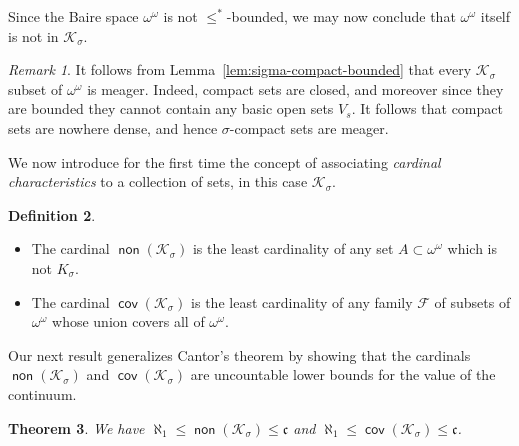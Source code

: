 \documentclass[11pt,oneside]{amsbook}
\newcommand{\Ksigma}{\mathcal K_\sigma}
\DeclareMathOperator{\non}{\mathsf{non}}
\DeclareMathOperator{\cov}{\mathsf{cov}}
\theoremstyle{definition}
\theoremstyle{plain}
\newtheorem{theorem}{Theorem}[section]
\theoremstyle{definition}
\newtheorem{definition}[theorem]{Definition}
\theoremstyle{remark}
\newtheorem{remark}[theorem]{Remark}
\numberwithin{equation}{section}
\numberwithin{figure}{section}
\begin{document}
Since the Baire space $\omega^\omega$ is not $\leq^*$-bounded, we may now conclude that $\omega^\omega$ itself is not in $\mathcal K_\sigma$.

\begin{remark}
  \label{rem:ksigma-meager}
  It follows from Lemma~\ref{lem:sigma-compact-bounded} that every $\Ksigma$ subset of $\omega^\omega$ is meager. Indeed, compact sets are closed, and moreover since they are bounded they cannot contain any basic open sets $V_s$. It follows that compact sets are nowhere dense, and hence $\sigma$-compact sets are meager.
\end{remark}


We now introduce for the first time the concept of associating \emph{cardinal characteristics} to a collection of sets, in this case $\mathcal K_\sigma$.

\begin{definition}
  \begin{itemize}
  \item The cardinal $\non(\Ksigma)$ is the least cardinality of any set $A\subset\omega^\omega$ which is not $K_\sigma$.
  \item The cardinal $\cov(\Ksigma)$ is the least cardinality of any family $\mathcal F$ of subsets of $\omega^\omega$ whose union covers all of $\omega^\omega$.
  \end{itemize}
\end{definition}

Our next result generalizes Cantor's theorem by showing that the cardinals $\non(\Ksigma)$ and $\cov(\Ksigma)$ are uncountable lower bounds for the value of the continuum.

\begin{theorem}
  \label{thm:k-sigma}
  We have $\aleph_1\leq\non(\Ksigma)\leq\mathfrak c$ and $\aleph_1\leq\cov(\Ksigma)\leq\mathfrak c$.
\end{theorem}
\end{document}
